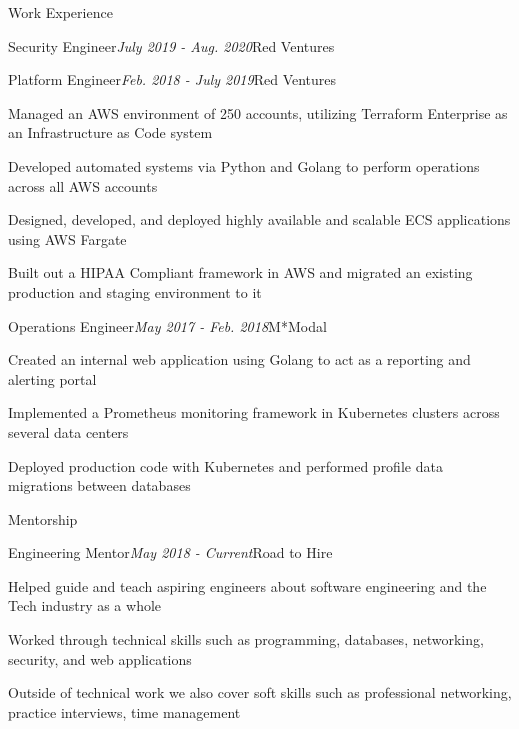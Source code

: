 \documentclass{resume} %
\begin{document}
\begin{rSection}{\vspace{-5pt}Work Experience}
\begin{rSubsection}{Security Engineer}{\em July 2019 - Aug. 2020}{Red Ventures}{}
  \end{rSubsection}



\begin{rSubsection}{Platform Engineer}{\em Feb. 2018 - July 2019}{Red Ventures}{}
\item {Managed an AWS environment of 250 accounts, utilizing Terraform Enterprise as an Infrastructure as Code system}
\item {Developed automated systems via Python and Golang to perform operations across all AWS accounts}
\item {Designed, developed, and deployed highly available and scalable ECS applications using AWS Fargate}
\item {Built out a HIPAA Compliant framework in AWS and migrated an existing production and staging environment to it}

\end{rSubsection}



\begin{rSubsection}{Operations Engineer}{\em May 2017 - Feb. 2018}{M*Modal}{}
\item {Created an internal web application using Golang to act as a reporting and alerting portal}
\item {Implemented a Prometheus monitoring framework in Kubernetes clusters across several data centers}
\item {Deployed production code with Kubernetes and performed profile data migrations between databases}
\end{rSubsection}

\end{rSection}


\begin{rSection}{\vspace{-5pt}Mentorship}
  \begin{rSubsection}{Engineering Mentor}{\em May 2018 - Current}{Road to Hire}{}
  \item {Helped guide and teach aspiring engineers about software engineering and the Tech industry as a whole}
  \item {Worked through technical skills such as programming, databases, networking, security, and web applications}
  \item {Outside of technical work we also cover soft skills such as professional networking, practice interviews, time management}
  \end{rSubsection}
\end{rSection}
\end{document}
